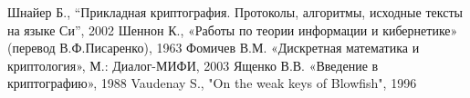 \begin{thebibliography}{1}
 Шнайер Б., ``Прикладная криптография. Протоколы, алгоритмы, исходные тексты на языке Си'', 2002
 Шеннон К., «Работы по теории информации и кибернетике» (перевод В.Ф.Писаренко), 1963
 Фомичев В.М. «Дискретная математика и криптология», М.: Диалог-МИФИ, 2003
 Ященко В.В. «Введение в криптографию», 1988
 Vaudenay S., "On the weak keys of Blowfish", 1996
\end{thebibliography}
